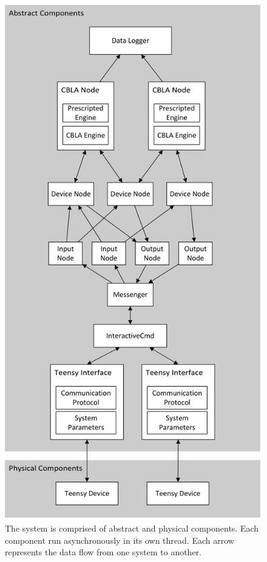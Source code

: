 \begin{figure}
\centering
\includegraphics[height=0.85 \textheight]{"fig/interactive control system/high-level system architecture"}
\caption[High-level system architecture]{The system is comprised of abstract and physical components. Each component run asynchronously in its own thread. Each arrow represents the data flow from one system to another.}
\label{fig:system-architecture}
\end{figure}



